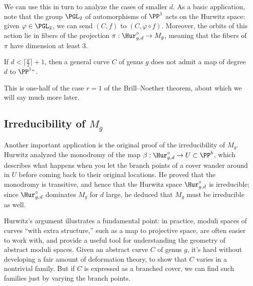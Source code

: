 We can use this in turn to analyze the cases of smaller $d$. As a
basic application, note that the group $\PGL_2$ of automorphisms of
$\PP^1$ acts on the Hurwitz space: given $\varphi \in \PGL_2$, we can
send $(C,f)$ to $(C, \varphi \circ f)$. Moreover, the orbits of this
action lie in fibers of the projection $\pi : \Hur^\circ_{g,d} \to M_g$,
meaning that the fibers of $\pi$ have dimension at least 3.

\begin{corollary}\label{branched cover BN}
If $d < \bigl\lceil \frac{g}{2} \bigr\rceil + 1$, then a general curve
$C$ of genus $g$ does not admit a map of degree $d$ to $\PP^1` `$.
\unif
\end{corollary}

This is one-half of the case $r=1$ of the
Brill--Noether theorem,
%
about which we will say much more later.

\subsection*{Irreducibility of $M_g$}

Another important application is the original proof of the
%
%
irreducibility of $M_g$. Hurwitz \citeyear{Hurwitz} analyzed the
%
%
monodromy of the map $\beta: \Hur^\circ_{g,d} \to U \subset\PP^b$,
which describes what happens
when you let the branch
points of a cover wander around in $U$ before coming back to their
original locations. He proved that the monodromy is transitive, and
hence that the Hurwitz space $\Hur^\circ_{g,d}$ is irreducible; since
$\Hur^\circ_{g,d}$ dominates $M_g$ for $d$ large, he deduced that $M_g$
must be irreducible as well.

Hurwitz's argument illustrates a fundamental point: in practice,
moduli spaces of curves ``with extra structure,'' such as a map to
projective space, are often easier to work with, and provide a useful
tool for understanding the geometry of abstract moduli spaces. Given an abstract curve $C$ of genus $g$, it's
hard without developing a fair amount of deformation
theory, to show that $C$ varies in a nontrivial family. But if
$C$ is expressed as a branched cover, we can find such families just
by varying the branch points.

